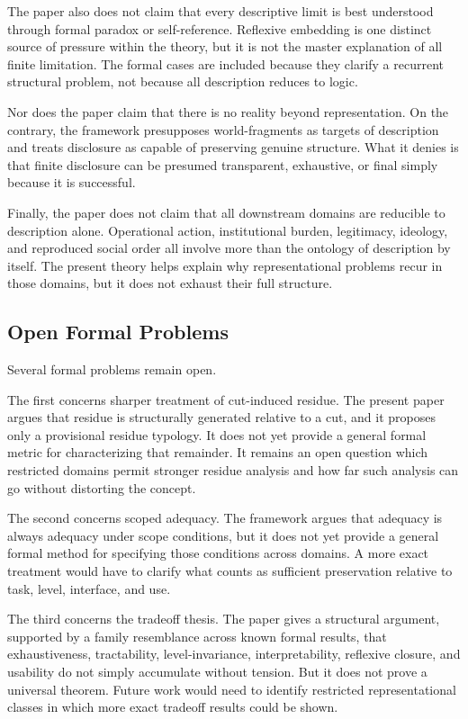 \documentclass[11pt]{article}
\begin{document}
The paper also does not claim that every descriptive limit is best understood through formal paradox or self-reference. Reflexive embedding is one distinct source of pressure within the theory, but it is not the master explanation of all finite limitation. The formal cases are included because they clarify a recurrent structural problem, not because all description reduces to logic. \cite{bolander_self_reference_sep}

Nor does the paper claim that there is no reality beyond representation. On the contrary, the framework presupposes world-fragments as targets of description and treats disclosure as capable of preserving genuine structure. What it denies is that finite disclosure can be presumed transparent, exhaustive, or final simply because it is successful. \cite{chakravartty_scientific_realism_sep,ladyman_structural_realism_sep}

Finally, the paper does not claim that all downstream domains are reducible to description alone. Operational action, institutional burden, legitimacy, ideology, and reproduced social order all involve more than the ontology of description by itself. The present theory helps explain why representational problems recur in those domains, but it does not exhaust their full structure.

\subsection{Open Formal Problems}

Several formal problems remain open.

The first concerns sharper treatment of cut-induced residue. The present paper argues that residue is structurally generated relative to a cut, and it proposes only a provisional residue typology. It does not yet provide a general formal metric for characterizing that remainder. It remains an open question which restricted domains permit stronger residue analysis and how far such analysis can go without distorting the concept.

The second concerns scoped adequacy. The framework argues that adequacy is always adequacy under scope conditions, but it does not yet provide a general formal method for specifying those conditions across domains. A more exact treatment would have to clarify what counts as sufficient preservation relative to task, level, interface, and use. \cite{frigg_nguyen_scientific_representation_sep}

The third concerns the tradeoff thesis. The paper gives a structural argument, supported by a family resemblance across known formal results, that exhaustiveness, tractability, level-invariance, interpretability, reflexive closure, and usability do not simply accumulate without tension. But it does not prove a universal theorem. Future work would need to identify restricted representational classes in which more exact tradeoff results could be shown. \cite{shannon_rate_distortion,geman_bias_variance,wolpert_no_free_lunch,arora_barak_complexity}
\end{document}
